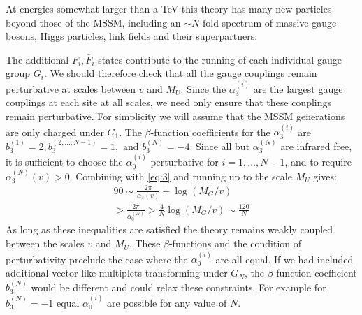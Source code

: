 \documentclass[a4paper,prl,twocolumn]{revtex4}
\begin{document}
At energies somewhat larger than a TeV this theory has many new
particles beyond those of the MSSM, including an $\sim N$-fold spectrum of
massive gauge bosons, Higgs particles, link fields and their
superpartners. 


The additional $F_i, {\bar F}_i$ states contribute to the running of
each individual gauge group $G_i$. We should therefore check that all
the gauge couplings remain perturbative at scales between $v$ and
$M_U$. Since the $\alpha_3^{(i)}$ are the largest gauge couplings at
each site at all scales, we need only ensure that these couplings
remain perturbative. For simplicity we will assume that the MSSM
generations are only charged under $G_1$. The $\beta$-function
coefficients for the $\alpha_3^{(i)}$ are $b_3^{(1)} = 2,
b_3^{(2,\dots,N-1)}=1, \text{ and } b_3^{(N)}=-4$. Since all but
$\alpha_3^{(N)}$ are infrared free, it is sufficient to choose the
$\alpha_0^{(i)}$ perturbative for $i=1,\dots,N-1$, 
and to require  $\alpha_3^{(N)}(v)>0$.
Combining with \eqref{eq:3}  and running  up to the scale
$M_U$ gives:
\begin{multline}
  \label{eq:11}
  90 \sim \frac{2\pi}{\alpha_3(v)} +  \log \left(M_G/v\right) \\ > 
  \frac{2\pi}{\alpha_0^{(N)}}  > \frac{4}{N} \log \left(M_G/v\right) \sim
  \frac{120}{N} 
\end{multline}
As long as these inequalities are satisfied the theory remains weakly
coupled between the scales $v$ and $M_U$. These $\beta$-functions and
the condition of perturbativity  preclude the
case where the $\alpha_0^{(i)}$  are all equal. If we had included
additional vector-like multiplets transforming  under
$G_N$, the $\beta$-function coefficient $b_3^{(N)}$ would be different
and could relax these constraints. For example for $b_3^{(N)}=-1$ equal
$\alpha_0^{(i)}$ are possible for any value of $N$.
\end{document}
